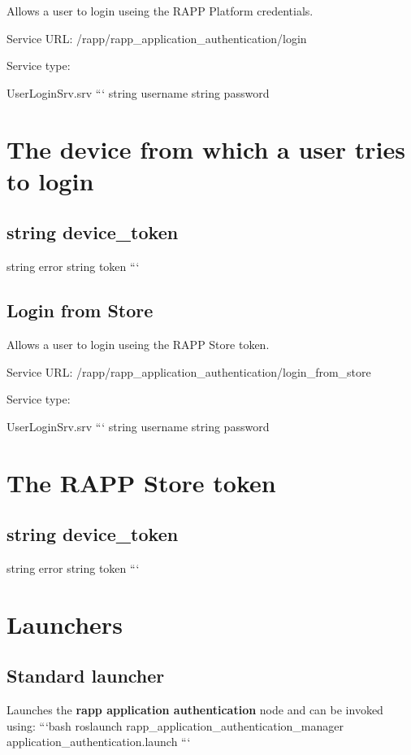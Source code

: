 Allows a user to login useing the R\-A\-P\-P Platform credentials.

Service U\-R\-L\-: {\ttfamily /rapp/rapp\-\_\-application\-\_\-authentication/login}

Service type\-:

User\-Login\-Srv.\-srv ``` string username string password \section*{The device from which a user tries to login}

\subsection*{string device\-\_\-token }

string error string token ```

\subsection*{Login from Store}

Allows a user to login useing the R\-A\-P\-P Store token.

Service U\-R\-L\-: {\ttfamily /rapp/rapp\-\_\-application\-\_\-authentication/login\-\_\-from\-\_\-store}

Service type\-:

User\-Login\-Srv.\-srv ``` string username string password \section*{The R\-A\-P\-P Store token}

\subsection*{string device\-\_\-token }

string error string token ```

\section*{Launchers}

\subsection*{Standard launcher}

Launches the {\bfseries rapp application authentication} node and can be invoked using\-: ```bash roslaunch rapp\-\_\-application\-\_\-authentication\-\_\-manager application\-\_\-authentication.\-launch ```


